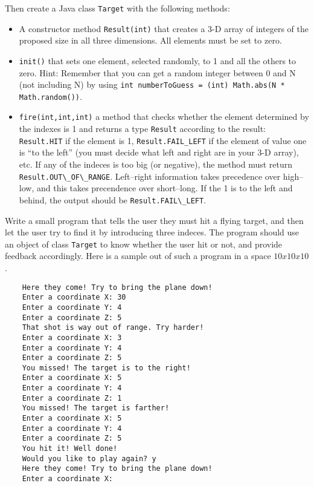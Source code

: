 \documentclass{article}
\begin{document}
Then create a Java class \verb+Target+ with the following methods: 

\begin{itemize}
\item A constructor method \verb+Result(int)+ that creates a 3-D array 
  of integers of the
  proposed size in all three dimensions. All elements must be set to
  zero.
\item \verb+init()+ that sets one element, selected randomly, to 1 and
  all the others to zero. Hint: Remember that you can get a random
  integer between 0 and N (not including N) by
  using \verb+int numberToGuess = (int) Math.abs(N * Math.random())+.
\item \verb+fire(int,int,int)+ a method that checks whether the
  element determined by the indexes is 1 and returns a type
  \verb+Result+ according to the result: \verb+Result.HIT+ if the
  element is 1, \verb+Result.FAIL_LEFT+ if the element of value one is
  ``to the left'' (you must decide what left and right are in your 3-D
  array), etc. If any of the indeces is too big (or negative), the
  method must return \verb+Result.OUT\_OF\_RANGE+. Left--right
  information takes precedence over high--low, and this takes
  precendence over short--long. If the 1 is to the left and behind,
  the output should be \verb+Result.FAIL\_LEFT+.
\end{itemize}

Write a small program that tells the user they must hit a flying
target, and then let the user try to find it by introducing three
indeces. The program should use an object of class \verb+Target+ to
know whether the user hit or not, and provide feedback
accordingly. Here is a sample out of such a program in a space $10 x
10 x 10$. 

\begin{verbatim}
    Here they come! Try to bring the plane down!
    Enter a coordinate X: 30
    Enter a coordinate Y: 4
    Enter a coordinate Z: 5
    That shot is way out of range. Try harder!
    Enter a coordinate X: 3
    Enter a coordinate Y: 4
    Enter a coordinate Z: 5
    You missed! The target is to the right!
    Enter a coordinate X: 5
    Enter a coordinate Y: 4
    Enter a coordinate Z: 1
    You missed! The target is farther!
    Enter a coordinate X: 5
    Enter a coordinate Y: 4
    Enter a coordinate Z: 5
    You hit it! Well done!
    Would you like to play again? y
    Here they come! Try to bring the plane down!
    Enter a coordinate X: 
\end{verbatim}
\end{document}
